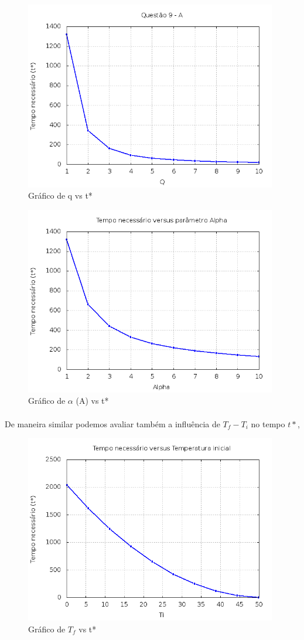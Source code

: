 \documentclass[a4paper,11pt]{article}
\begin{document}
\begin{figure}[H]
\includegraphics[width=11cm]{../image/questao9a.png}
\centering
\caption{Gráfico de q vs t*}
\end{figure}

\begin{figure}[H]
\includegraphics[width=11cm]{../image/questao9b.png}
\centering
\caption{Gráfico de $\alpha$ (A) vs t*}
\end{figure}

\paragraph{}De maneira similar podemos avaliar também a influência de $T_f-T_i$ no tempo $t*$,

\begin{figure}[H]
\includegraphics[width=11cm]{../image/questao10.png}
\centering
\caption{Gráfico de $T_f$ vs t*}
\end{figure}

\end{document}
